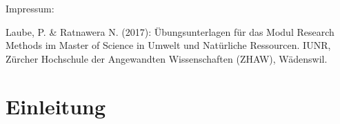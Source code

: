 \documentclass[]{book}
\begin{document}
\begin{titlepage}
% 		
% 		

\newpage
\thispagestyle{empty}
\begin{minipage}{15cm}
\begin{flushleft}




\vspace{18cm}
{\large Impressum:}

\vspace{0.5cm}

Laube, P. \& Ratnawera N. (2017): Übungsunterlagen für das Modul Research Methods im Master of Science in Umwelt und Natürliche Ressourcen. IUNR, Zürcher Hochschule der Angewandten Wissenschaften (ZHAW), W{\"a}denswil.

\end{flushleft}
\end{minipage}

\end{titlepage}
\restoregeometry

{
\setcounter{tocdepth}{1}
\tableofcontents
}
\chapter{Einleitung}\label{einleitung}
\end{document}
